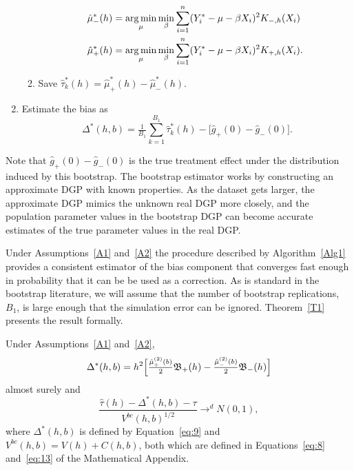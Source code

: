 \documentclass[12pt,fleqn]{article}
\begin{document}
\begin{algorithm}
\begin{enumerate}
\begin{enumerate}
\begin{align*}
        \hat\mu_-^*(h)
        &= \operatorname*{arg\,min}_{\mu} \min_{\beta} \sum_{i =1}^n
          (Y_i^* - \mu - \beta X_i)^2 K_{-,h}(X_{i}) \\
        \hat\mu_+^*(h)
        &= \operatorname*{arg\,min}_{\mu} \min_{\beta} \sum_{i = 1}^n
          (Y_i^* - \mu - \beta X_i)^2 K_{+,h}(X_{i}).
      \end{align*}
    \item Save $\hat\tau^*_k(h) = \hat\mu_+^*(h) - \hat\mu_-^*(h)$.
    \end{enumerate}
  \item Estimate the bias as
    \begin{equation}
      \label{eq:9}
      \Delta^*(h,b) = \tfrac{1}{B_1} \sum_{k=1}^{B_1} \hat\tau^*_k(h) -
      \big[\hat g_+(0) - \hat g_-(0)\big].
    \end{equation}
  \end{enumerate}
\end{algorithm}
Note that $\hat g_+(0) - \hat g_-(0)$ is the true treatment effect under the
distribution induced by this bootstrap. The bootstrap estimator works by
constructing an approximate DGP with known properties. As the dataset gets
larger, the approximate DGP mimics the unknown real DGP more closely, and the
population parameter values in the bootstrap DGP can become accurate estimates
of the true parameter values in the real DGP.

Under Assumptions~\ref{A1} and~\ref{A2} the procedure described by
Algorithm~\ref{Alg1} provides a consistent estimator of the bias component that
converges fast enough in probability that it can be be used as a correction. As
is standard in the bootstrap literature, we will assume that the number of
bootstrap replications, $B_{1}$, is large enough that the simulation error can
be ignored. Theorem~\ref{T1} presents the result formally.

\begin{theorem}\label{T1}
  Under Assumptions~\ref{A1} and~\ref{A2},
\begin{equation}
  \label{eq:18}
  \Delta^*(h,b) = h^{2} \Big[\tfrac{\hat{\mu}_{+}^{(2)}(b)}{2} \mathfrak{B}_{+}(h)
  - \tfrac{\hat{\mu}_{-}^{(2)}(b)}{2}\mathfrak{B}_{-}(h) \Big]
\end{equation}
almost surely and
\begin{equation}
  \label{eq:4}
  \frac{\hat\tau(h) - \Delta^{*}(h,b) - \tau}{ V^{bc}(h, b)^{1/2}}
  \to^{d} N(0,1),
\end{equation}
where $\Delta^*(h,b)$ is defined by Equation~\eqref{eq:9} and
$V^{bc}(h, b) = V(h) + C(h, b)$, both which are defined in Equations~\eqref{eq:8}
and~\eqref{eq:13} of the Mathematical Appendix.
\end{theorem}
\end{document}
